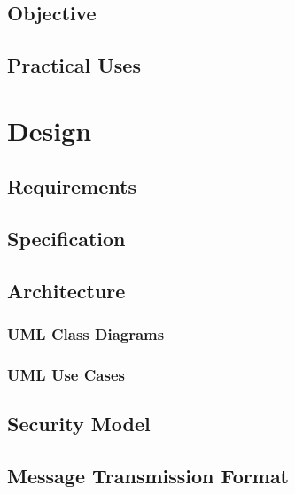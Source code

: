 \documentclass[a4paper,12pt]{report}
\begin{document}
\section{Objective}



\section{Practical Uses}




\chapter{Design}

\section{Requirements}



\section{Specification}



\section{Architecture}



\subsection{UML Class Diagrams}





\subsection{UML Use Cases}



\section{Security Model}

\section{Message Transmission Format}
\end{document}
